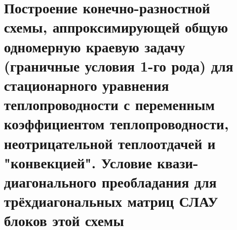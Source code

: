 \documentclass[__main__.tex]{subfiles}
\begin{document}
\section{Построение конечно-разностной схемы, аппроксимирующей общую одномерную краевую задачу (граничные условия 1-го рода) для стационарного уравнения теплопроводности с переменным коэффициентом теплопроводности, неотрицательной теплоотдачей и "конвекцией". Условие квази-диагонального преобладания для трёхдиагональных матриц СЛАУ блоков этой схемы}
\end{document}
